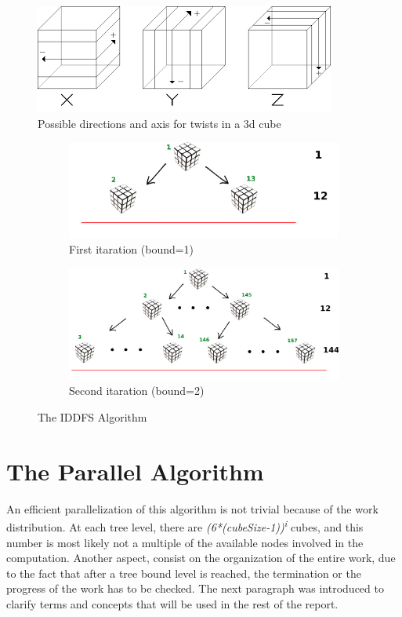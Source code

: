 \documentclass[a4paper]{article}
\begin{document}
\begin{figure}[ht]
  \centering
  \includegraphics[width=0.5\linewidth]{xyz}
  \caption{Possible directions and axis for twists in a 3d cube}
  \label{fig:tw}
\end{figure}
\FloatBarrier

\begin{figure}
\begin{subfigure}{0.40\textwidth}
\includegraphics[width=\linewidth]{rubik_tree_eval1}
\caption{First itaration (bound=1)} \label{fig:ita}
\end{subfigure}
\hspace*{\fill} %
\begin{subfigure}{0.60\textwidth}
\includegraphics[width=\linewidth]{rubik_tree_eval2}
\caption{Second itaration (bound=2)} \label{fig:itb}
\end{subfigure}
\caption{The IDDFS Algorithm} \label{fig:iterations}
\end{figure}
\FloatBarrier

\section{The Parallel Algorithm}
\label{sec:par_algo}
An efficient parallelization of this algorithm is not trivial because of the work distribution. At each tree level, there are \textit{(6*(cubeSize-1))\textsuperscript{i}} cubes, and this number is most likely not a multiple of the available nodes involved in the computation. Another aspect, consist on the organization of the entire work, due to the fact that after a tree bound level is reached, the termination or the progress of the work has to be checked. The next paragraph was introduced to clarify terms and concepts that will be used in the rest of the report.
\end{document}
